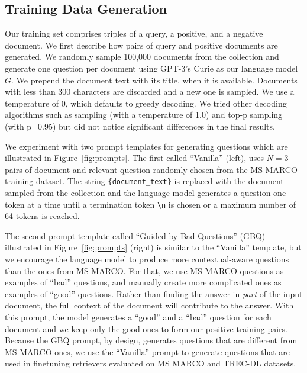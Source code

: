 \documentclass[11pt]{article}
\begin{document}
\subsection{Training Data Generation}

Our training set comprises triples of a query, a positive, and a negative document. We first describe how pairs of query and positive documents are generated.
We randomly sample 100,000 documents from the collection and generate one question per document using GPT-3's Curie as our language model $G$. We prepend the document text with its title, when it is available. Documents with less than 300 characters are discarded and a new one is sampled.
We use a temperature of 0, which defaults to greedy decoding. We tried other decoding algorithms such as sampling (with a temperature of 1.0) and top-p sampling~\cite{holtzman2019curious} (with p=0.95) but did not notice significant differences in the final results.

We experiment with two prompt templates for generating questions which are illustrated in Figure~\ref{fig:prompts}.
The first called ``Vanilla'' (left), uses $N=3$ pairs of document and relevant question randomly chosen from the MS MARCO training dataset. The string \texttt{\{document\_text\}} is replaced with the document sampled from the collection and the language model generates a question one token at a time until a termination token \texttt{\textbackslash n} is chosen or a maximum number of 64 tokens is reached.

The second prompt template called ``Guided by Bad Questions'' (GBQ) illustrated in Figure~\ref{fig:prompts} (right) is similar to the ``Vanilla'' template, but we encourage the language model to produce more contextual-aware questions than the ones from MS MARCO. For that, we use MS MARCO questions as examples of ``bad'' questions, and manually create more complicated ones as examples of ``good'' questions. Rather than finding the answer in \textit{part} of the input document, the full context of the document will contribute to the answer.
With this prompt, the model generates a ``good'' and a ``bad'' question for each document and we keep only the good ones to form our positive training pairs.
Because the GBQ prompt, by design, generates questions that are different from MS MARCO ones, we use the ``Vanilla'' prompt to generate questions that are used in finetuning retrievers evaluated on MS MARCO and TREC-DL datasets.
\end{document}
